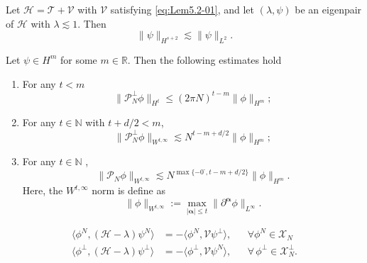 \documentclass[10pt,a4paper]{amsart}
\newcommand{\m}{\textbf{-}}
\begin{document}
\begin{lemma}\label{Lem5.4}
Let $\mathcal{H}=\mathcal{T}+\mathcal{V}$ with $\mathcal{V}$ satisfying \eqref{eq:Lem5.2-01}, and let $(\lambda,\psi)$ be an eigenpair of $\mathcal{H}$ with $\lambda\lesssim 1$. Then 
    \begin{equation}\label{Eq-Lem5.4-01}
    \|\psi\|_{H^{s+2}} \lesssim \|\psi\|_{L^2}.
    \end{equation}
\end{lemma}

\begin{lemma}\label{Lem5.5}
    Let  $\psi\in H^{m}$ for some $m\in \mathbb{R}$. Then the following estimates hold
    \begin{enumerate}

        \item [$(\mathrm{i})$] For any $t<m$
        \begin{equation}\label{eq-Lem5.5-01}
            \|\mathcal{P}_N^\perp \phi\|_{H^t} \leq (2\pi N)^{t-m}\|\phi\|_{H^{m}};
        \end{equation}
        
        \item [$(\mathrm{ii})$] For any $t\in \mathbb{N}$ with $t+d/2 < m$,
        \begin{equation}\label{eq-Lem5.5-02}
            \|\mathcal{P}_N^\perp \phi\|_{W^{t,\infty}} \lesssim N^{t-m+d/2}\|\phi\|_{H^{m}};
        \end{equation}

        
        \item [$(\mathrm{iii})$] For any $t\in \mathbb{N}$ ,
        \begin{equation}\label{eq-Lem5.5-03}
            \|\mathcal{P}_N \phi\|_{W^{t,\infty}} \lesssim N^{\max\{-0^{\m},t-m+d/2\}}\|\phi\|_{H^{m}}.
        \end{equation}
        Here, the $W^{t,\infty}$ norm is define as 
        \[
            \|\phi\|_{W^{t,\infty}} :=\max_{|\bm \alpha|\leq t}\| \partial^{\bm \alpha}\phi\|_{L^{\infty}}.
        \]
    \end{enumerate}
\end{lemma}

\begin{align}
\label{Eq-5.2-01a}
    \langle \phi^N, (\mathcal{H}-\lambda)\psi^N\rangle  
&= -\langle \phi^N, \mathcal{V}\psi^\perp\rangle,
&&\forall\phi^N\in \mathscr{X}_N
\\
\label{Eq-5.2-01b}
\langle \phi^\perp, (\mathcal{H}-\lambda)\psi^\perp\rangle 
&= -\langle \phi^\perp, \mathcal{V}\psi^N\rangle , 
&&\forall\,\phi^\perp\in \mathscr{X}^\perp_N.
\end{align}
\end{document}
